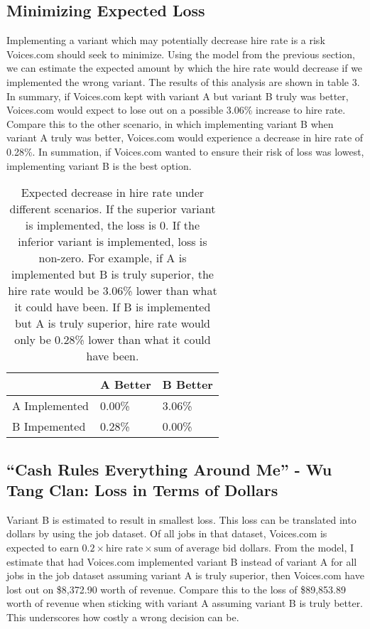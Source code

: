 \documentclass[]{article}
\begin{document}
\hypertarget{minimizing-expected-loss}{%
\subsection{Minimizing Expected Loss}\label{minimizing-expected-loss}}

Implementing a variant which may potentially decrease hire rate is a
risk Voices.com should seek to minimize. Using the model from the
previous section, we can estimate the expected amount by which the hire
rate would decrease if we implemented the wrong variant. The results of
this analysis are shown in table 3. In summary, if Voices.com kept with
variant A but variant B truly was better, Voices.com would expect to
lose out on a possible 3.06\% increase to hire rate. Compare this to the
other scenario, in which implementing variant B when variant A truly was
better, Voices.com would experience a decrease in hire rate of 0.28\%.
In summation, if Voices.com wanted to ensure their risk of loss was
lowest, implementing variant B is the best option.

\begin{table}[!h]

\caption{\label{tab:unnamed-chunk-5}Expected decrease in hire rate under different scenarios.  If the superior variant is implemented, the loss is 0.  If the inferior variant is implemented, loss is non-zero. For example, if A is implemented but B is truly superior, the hire rate would be 3.06\% lower than what it could have been.  If B is implemented but A is truly superior, hire rate would only be 0.28\% lower than what it could have been. }
\centering
\begin{tabular}[t]{lll}
\toprule
 & A Better & B Better\\
\midrule
\rowcolor{gray!6}  A Implemented & 0.00\% & 3.06\%\\
B Impemented & 0.28\% & 0.00\%\\
\bottomrule
\end{tabular}
\end{table}

\hypertarget{cash-rules-everything-around-me---wu-tang-clan-loss-in-terms-of-dollars}{%
\subsection{``Cash Rules Everything Around Me'' - Wu Tang Clan: Loss in
Terms of
Dollars}\label{cash-rules-everything-around-me---wu-tang-clan-loss-in-terms-of-dollars}}

Variant B is estimated to result in smallest loss. This loss can be
translated into dollars by using the job dataset. Of all jobs in that
dataset, Voices.com is expected to earn
\(0.2 \times \mbox{hire rate} \times \mbox{sum of average bid}\)
dollars. From the model, I estimate that had Voices.com implemented
variant B instead of variant A for all jobs in the job dataset assuming
variant A is truly superior, then Voices.com have lost out on \$8,372.90
worth of revenue. Compare this to the loss of \$89,853.89 worth of
revenue when sticking with variant A assuming variant B is truly better.
This underscores how costly a wrong decision can be.
\end{document}
